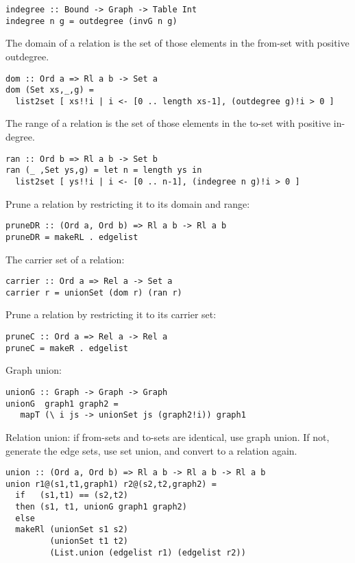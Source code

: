 \bc\begin{verbatim}
indegree :: Bound -> Graph -> Table Int
indegree n g = outdegree (invG n g)
\end{verbatim}\ec

The domain of a relation is the set of those elements in the from-set with
positive outdegree. 

\bc\begin{verbatim}
dom :: Ord a => Rl a b -> Set a
dom (Set xs,_,g) = 
  list2set [ xs!!i | i <- [0 .. length xs-1], (outdegree g)!i > 0 ]
\end{verbatim}\ec

The range of a relation is the set of those elements in the to-set with
positive in-degree. 

\bc\begin{verbatim}
ran :: Ord b => Rl a b -> Set b
ran (_ ,Set ys,g) = let n = length ys in 
  list2set [ ys!!i | i <- [0 .. n-1], (indegree n g)!i > 0 ]
\end{verbatim}\ec

Prune a relation by restricting it to its domain and range: 

\bc\begin{verbatim}
pruneDR :: (Ord a, Ord b) => Rl a b -> Rl a b 
pruneDR = makeRL . edgelist 
\end{verbatim}\ec

The carrier set of a relation: 

\bc\begin{verbatim} 
carrier :: Ord a => Rel a -> Set a  
carrier r = unionSet (dom r) (ran r)  
\end{verbatim}\ec

Prune a relation by restricting it to its carrier set: 

\bc\begin{verbatim}
pruneC :: Ord a => Rel a -> Rel a
pruneC = makeR . edgelist 
\end{verbatim}\ec


Graph union: 

\bc\begin{verbatim}
unionG :: Graph -> Graph -> Graph 
unionG  graph1 graph2 = 
   mapT (\ i js -> unionSet js (graph2!i)) graph1
\end{verbatim}\ec

Relation union: if from-sets and to-sets are identical, use graph union. 
If not, generate the edge sets, use set union, and convert to 
a relation again. 

\bc\begin{verbatim}
union :: (Ord a, Ord b) => Rl a b -> Rl a b -> Rl a b 
union r1@(s1,t1,graph1) r2@(s2,t2,graph2) = 
  if   (s1,t1) == (s2,t2)
  then (s1, t1, unionG graph1 graph2) 
  else  
  makeRl (unionSet s1 s2) 
         (unionSet t1 t2) 
         (List.union (edgelist r1) (edgelist r2))
\end{verbatim}\ec

